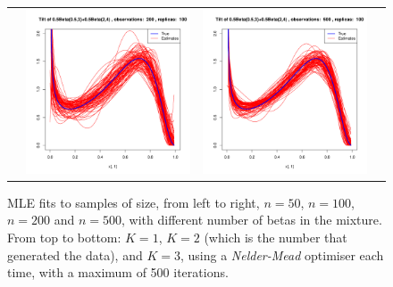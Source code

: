 \documentclass[10pt]{report}
\begin{document}
\begin{figure}[h]
\begin{tabular}{cccc}
	&
	\includegraphics[width=\textwidth/4]{../img/p05_a05_b3_p05_a2_b4/tilted/K3/densities/n200_R100.pdf}
	&
	\includegraphics[width=\textwidth/4]{../img/p05_a05_b3_p05_a2_b4/tilted/K3/densities/n500_R100.pdf}\\
	
\end{tabular}
\caption{MLE fits to samples of size, from left to right, $n=50$, $n=100$, $n=200$ and $n=500$, with different number of betas in the mixture. From top to bottom: $K=1$, $K=2$ (which is the number that generated the data), and $K=3$, using a \textit{Nelder-Mead} optimiser each time, with a maximum of 500 iterations.}
\label{fig:TDB1}
\end{figure}
\end{document}
